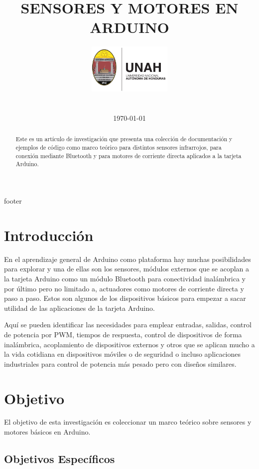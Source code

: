 \documentclass[conference]{IEEEtran}
\title{SENSORES Y MOTORES EN ARDUINO}
\author{
    \includegraphics[width = 40mm]{images/logo-unah}\\[8ex]
    \IEEEauthorblockN{Tobias Briones}
    \IEEEauthorblockN{tobias.briones@unah.hn}
    \IEEEauthorblockA{\textit{Universidad Nacional Autónoma de Honduras} \\
    \textit{Ingeniería de Sistemas} \\
    \textit{I PAC 2022} \\
    \textit{IS911-MICROPROCESADORES}} \\\vspace*{20pt} \normalsize  \\
    \today
}
\begin{document}
    \maketitle

    \begin{abstract}
        Este es un artículo de investigación que presenta una colección de documentación y ejemplos de código como marco teórico para distintos sensores infrarrojos, para conexión mediante Bluetooth y para motores de corriente directa aplicados a la tarjeta Arduino.
    \end{abstract}

    \tableofcontents

    {footer}

    \section{Introducción}\label{sec:introduction}

    En el aprendizaje general de Arduino como plataforma hay muchas posibilidades para explorar y una de ellas son los sensores, módulos externos que se acoplan a la tarjeta Arduino como un módulo Bluetooth para conectividad inalámbrica y por último pero no limitado a, actuadores como motores de corriente directa y paso a paso. Estos son algunos de los dispositivos básicos para empezar a sacar utilidad de las aplicaciones de la tarjeta Arduino.

    \bigbreak

    Aquí se pueden identificar las necesidades para emplear entradas, salidas, control de potencia por PWM, tiempos de respuesta, control de dispositivos de forma inalámbrica, acoplamiento de dispositivos externos y otros que se aplican mucho a la vida cotidiana en dispositivos móviles o de seguridad o incluso aplicaciones industriales para control de potencia más pesado pero con diseños similares.

    \section{Objetivo}\label{sec:objetivo}

    El objetivo de esta investigación es coleccionar un marco teórico sobre sensores y motores básicos en Arduino.

    \subsection{Objetivos Específicos}\label{subsec:objetivos-específicos}
\end{document}
